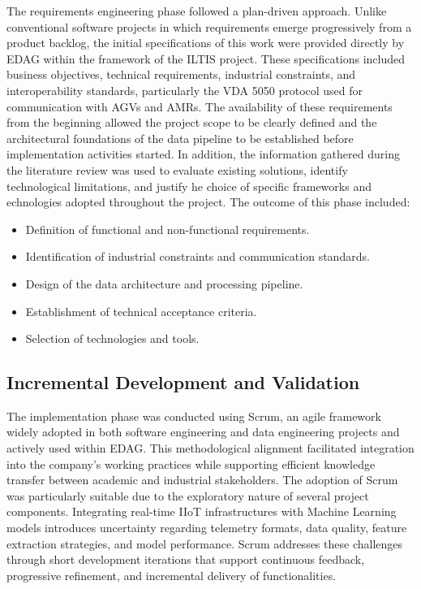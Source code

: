 The requirements engineering phase followed a plan-driven approach. Unlike conventional software projects in which requirements emerge progressively from a product backlog, the initial specifications of this work were provided directly by EDAG within the framework of the ILTIS project. These specifications included business objectives, technical requirements, industrial constraints, and interoperability standards, particularly the VDA 5050 protocol used for communication with AGVs and AMRs. The availability of these requirements from the beginning allowed the project scope to be clearly defined and the architectural foundations of the data pipeline to be established before implementation activities started.
In addition, the information gathered during the literature review was used to evaluate existing solutions, identify technological limitations, and justify he choice of specific frameworks and echnologies adopted throughout the project.
The outcome of this phase included:
\begin{itemize}
    \item Definition of functional and non-functional requirements.
    \item Identification of industrial constraints and communication standards.
    \item Design of the data architecture and processing pipeline.
    \item Establishment of technical acceptance criteria.
    \item Selection of technologies and tools.
\end{itemize}

\subsection{Incremental Development and Validation}

The implementation phase was conducted using Scrum\cite{schwaber2020scrum}, an agile framework widely adopted in both software engineering and data engineering projects and actively used within EDAG. This methodological alignment facilitated integration into the company's working practices while supporting efficient knowledge transfer between academic and industrial stakeholders.
The adoption of Scrum was particularly suitable due to the exploratory nature of several project components. Integrating real-time IIoT infrastructures with Machine Learning models introduces uncertainty regarding telemetry formats, data quality, feature extraction strategies, and model performance.
Scrum addresses these challenges through short development iterations that support continuous feedback, progressive refinement, and incremental delivery of functionalities.

